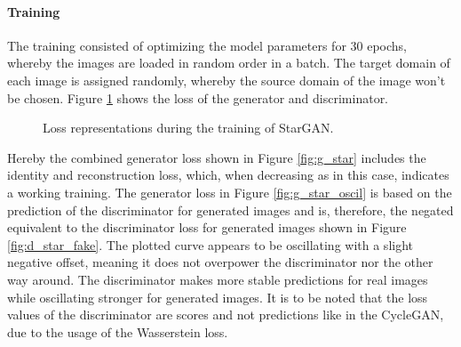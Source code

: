 \paragraph{Training} The training consisted of optimizing the model parameters for 30 epochs, whereby the images are loaded in random order in a batch.
The target domain of each image is assigned randomly, whereby the source domain of the image won't be chosen.
Figure \ref{fig:star_train} shows the loss of the generator and discriminator.
\begin{figure}[tb]
    \centering
    \hfill
    \hfill
    
    \vspace{0.5cm}
    
    \hfill
    \hfill
    \caption{Loss representations during the training of StarGAN.}\label{fig:star_train}
\end{figure}
Hereby the combined generator loss shown in Figure \ref{fig:g_star} includes the identity and reconstruction loss, which, when decreasing as in this case, indicates a working training.
The generator loss in Figure \ref{fig:g_star_oscil} is based on the prediction of the discriminator for generated images and is, therefore, the negated equivalent to the discriminator loss for generated images shown in Figure \ref{fig:d_star_fake}. 
The plotted curve appears to be oscillating with a slight negative offset, meaning it does not overpower the discriminator nor the other way around.
The discriminator makes more stable predictions for real images while oscillating stronger for generated images.
It is to be noted that the loss values of the discriminator are scores and not predictions like in the CycleGAN, due to the usage of the Wasserstein loss.

